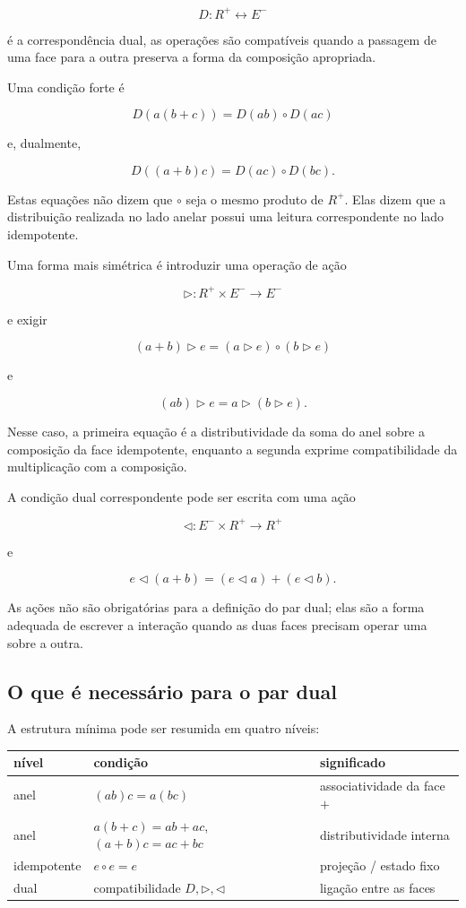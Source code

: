 \documentclass[11pt,a4paper]{article}
\begin{document}
$$
D:R^+\longleftrightarrow E^-
$$

é a correspondência dual, as operações são compatíveis quando a passagem
de uma face para a outra preserva a forma da composição apropriada.

Uma condição forte é

$$
\boxed{
D(a(b+c))
=
D(ab)\circ D(ac)
}
$$

e, dualmente,

$$
\boxed{
D((a+b)c)
=
D(ac)\circ D(bc).
}
$$

Estas equações não dizem que \(\circ\) seja o mesmo produto de \(R^+\).
Elas dizem que a distribuição realizada no lado anelar possui uma leitura
correspondente no lado idempotente.

Uma forma mais simétrica é introduzir uma operação de ação

$$
\triangleright:R^+\times E^-\to E^-
$$

e exigir

$$
\boxed{
(a+b)\triangleright e
=
(a\triangleright e)\circ(b\triangleright e)
}
$$

e

$$
\boxed{
(ab)\triangleright e
=
a\triangleright(b\triangleright e).
}
$$

Nesse caso, a primeira equação é a distributividade da soma do anel sobre
a composição da face idempotente, enquanto a segunda exprime
compatibilidade da multiplicação com a composição.

A condição dual correspondente pode ser escrita com uma ação

$$
\triangleleft:E^-\times R^+\to R^+
$$

e

$$
\boxed{
e\triangleleft(a+b)
=
(e\triangleleft a)+(e\triangleleft b).
}
$$

As ações não são obrigatórias para a definição do par dual; elas são a
forma adequada de escrever a interação quando as duas faces precisam
operar uma sobre a outra.

\subsection{O que é necessário para o par dual}

A estrutura mínima pode ser resumida em quatro níveis:

\begin{center}
\renewcommand{\arraystretch}{1.3}
\begin{tabular}{@{}lll@{}}
\toprule
\textbf{nível} & \textbf{condição} & \textbf{significado} \\
\midrule
anel & $(ab)c=a(bc)$ & associatividade da face \(+\) \\
anel & $a(b+c)=ab+ac$, $(a+b)c=ac+bc$ & distributividade interna \\
idempotente & $e\circ e=e$ & projeção / estado fixo \\
dual & compatibilidade $D,\triangleright,\triangleleft$ & ligação entre as faces \\
\bottomrule
\end{tabular}
\end{center}
\end{document}
